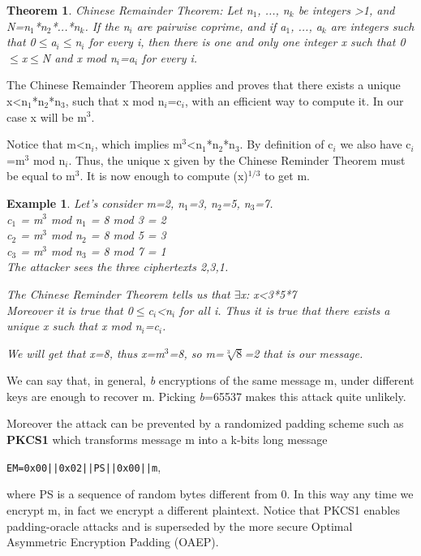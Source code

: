 \documentclass[a4paper, 12pt]{report}
\newtheorem{example}{\textbf{Example}}
\newtheorem{theorem}{\textbf{Theorem}}
\begin{document}
\begin{theorem}
	Chinese Remainder Theorem: Let n$_1$, ..., n$_k$ be integers >1, and N=n$_1$*n$_2$*...*n$_k$. If the n$_i$ are pairwise coprime, and if a$_1$, ..., a$_k$ are integers such that 0$\le$a$_i\le$n$_i$ for every i, then there is one and only one integer x such that 0$\le$x$\le$N and x mod n$_i$=a$_i$ for every i. 
\end{theorem}
 
The Chinese Remainder Theorem applies and proves that there exists a unique x<n$_1$*n$_2$*n$_3$, such that x mod n$_i$=c$_i$, with an efficient way to compute it. In our case x will be m$^3$.

Notice that m<n$_i$, which implies m$^3$<n$_1$*n$_2$*n$_3$. By definition of c$_i$ we also have c$_i$=m$^3$ mod n$_i$. Thus, the unique x given by the Chinese Reminder Theorem must be equal to m$^3$. It is now enough to compute (x)$^{1/3}$ to get m.

\begin{example}
	Let's consider m=2, n$_1$=3, n$_2$=5, n$_3$=7.\\
	c$_1$ = m$^3$ mod n$_1$ = 8 mod 3 = 2\\
	c$_2$ = m$^3$ mod n$_2$ = 8 mod 5 = 3\\
	c$_3$ = m$^3$ mod n$_3$ = 8 mod 7 = 1\\
	
	The attacker sees the three ciphertexts 2,3,1.
	
	The Chinese Reminder Theorem tells us that $\exists$x: x<3*5*7\\
	Moreover it is true that 0$\le$c$_i$<n$_i$ for all i. Thus it is true that there exists a unique x such that x mod n$_i$=c$_i$.
	
	We will get that x=8, thus x=m$^3$=8, so m=$\sqrt[3]{8}$=2 that is our message.
\end{example} 

We can say that, in general, \textit{b} encryptions of the same message m, under different keys are enough to recover m. Picking \textit{b}=65537 makes this attack quite unlikely.

Moreover the attack can be prevented by a randomized padding scheme such as \textbf{PKCS1} which transforms message m into a k-bits long message
\begin{center}
	\texttt{EM=0x00||0x02||PS||0x00||m},
\end{center}
where PS is a sequence of random bytes different from 0. In this way any time we encrypt m, in fact we encrypt a different plaintext. Notice that PKCS1 enables padding-oracle attacks and is superseded by the more secure Optimal Asymmetric Encryption Padding (OAEP).
\end{document}

